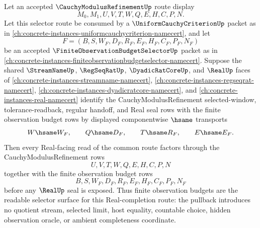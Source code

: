 \begin{theorem}
\label{thm:cauchy-modulus-refinement-finite-observation-budget-pullback}
Let an accepted $\CauchyModulusRefinementUp$ route display
$$
M_0,M_1,U,V,T,W,Q,E,H,C,P,N.
$$
Let this selector route be consumed by a $\UniformCauchyCriterionUp$ packet as in \autoref{ch:concrete-instances-uniformcauchycriterion-namecert}, and let
$$
F=(B,S,W_F,D_F,R_F,E_F,H_F,C_F,P_F,N_F)
$$
be an accepted $\FiniteObservationBudgetSelectorUp$ packet as in \autoref{ch:concrete-instances-finiteobservationbudgetselector-namecert}. Suppose the shared $\StreamNameUp$, $\RegSeqRatUp$, $\DyadicRatCoreUp$, and $\RealUp$ faces of \autoref{ch:concrete-instances-streamname-namecert}, \autoref{ch:concrete-instances-regseqrat-namecert}, \autoref{ch:concrete-instances-dyadicratcore-namecert}, and \autoref{ch:concrete-instances-real-namecert} identify the CauchyModulusRefinement selected-window, tolerance-readback, regular handoff, and Real seal rows with the finite observation budget rows by displayed componentwise $\hsame$ transports
$$
W \hsame W_F,\qquad
Q \hsame D_F,\qquad
T \hsame R_F,\qquad
E \hsame E_F.
$$
Then every Real-facing read of the common route factors through the CauchyModulusRefinement rows
$$
U,V,T,W,Q,E,H,C,P,N
$$
together with the finite observation budget rows
$$
B,S,W_F,D_F,R_F,E_F,H_F,C_F,P_F,N_F
$$
before any $\RealUp$ seal is exposed. Thus finite observation budgets are the readable selector surface for this Real-completion route: the pullback introduces no quotient stream, selected limit, host equality, countable choice, hidden observation oracle, or ambient completeness coordinate.
\end{theorem}
